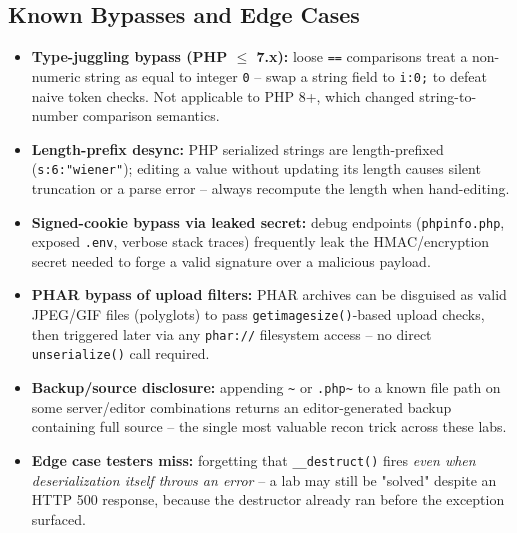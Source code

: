 \documentclass[11pt]{article}
\begin{document}
\subsection{Known Bypasses and Edge Cases}
\begin{itemize}
    \item \textbf{Type-juggling bypass (PHP $\leq$ 7.x):} loose \verb|==| comparisons treat a non-numeric string as equal to integer \verb|0| -- swap a string field to \verb|i:0;| to defeat naive token checks. Not applicable to PHP 8+, which changed string-to-number comparison semantics.
    \item \textbf{Length-prefix desync:} PHP serialized strings are length-prefixed (\verb|s:6:"wiener"|); editing a value without updating its length causes silent truncation or a parse error -- always recompute the length when hand-editing.
    \item \textbf{Signed-cookie bypass via leaked secret:} debug endpoints (\texttt{phpinfo.php}, exposed \texttt{.env}, verbose stack traces) frequently leak the HMAC/encryption secret needed to forge a valid signature over a malicious payload.
    \item \textbf{PHAR bypass of upload filters:} PHAR archives can be disguised as valid JPEG/GIF files (polyglots) to pass \texttt{getimagesize()}-based upload checks, then triggered later via any \texttt{phar://} filesystem access -- no direct \verb|unserialize()| call required.
    \item \textbf{Backup/source disclosure:} appending \verb|~| or \verb|.php~| to a known file path on some server/editor combinations returns an editor-generated backup containing full source -- the single most valuable recon trick across these labs.
    \item \textbf{Edge case testers miss:} forgetting that \verb|__destruct()| fires \textit{even when deserialization itself throws an error} -- a lab may still be "solved" despite an HTTP 500 response, because the destructor already ran before the exception surfaced.
\end{itemize}
\end{document}
